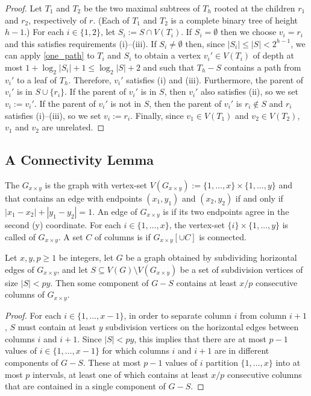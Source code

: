 \documentclass{patmorin}
\renewcommand{\le}{\leqslant}
\renewcommand{\ge}{\geqslant}
\begin{document}
\begin{proof}
  Let $T_1$ and $T_2$ be the two maximal subtrees of $T_h$ rooted at the children $r_1$ and $r_2$, respectively of $r$. (Each of $T_1$ and $T_2$ is a complete binary tree of height $h-1$.)  For each $i\in\{1,2\}$, let $S_i:=S\cap V(T_i)$.  If $S_i=\emptyset$ then we choose $v_i=r_i$ and this satisfies requirements (i)--(iii).  If $S_i\neq\emptyset$ then, since $|S_i|\le |S|< 2^{h-1}$, we can apply \cref{one_path} to $T_i$ and $S_i$ to obtain a vertex $v_i'\in V(T_i)$ of depth at most $1+\log_2|S_i|+1 \le \log_2 |S| + 2$ and such that $T_h-S$ contains a path from $v_i'$ to a leaf of $T_h$.  Therefore, $v_i'$ satisfies (i) and (iii).  Furthermore, the parent of $v_i'$ is in $S\cup\{r_i\}$.  If the parent of $v_i'$ is in $S$, then $v_i'$ also satisfies (ii), so we set $v_i:=v_i'$.  If the parent of $v_i'$ is not in $S$, then the parent of $v_i'$ is $r_i\not\in S$ and $r_i$ satisfies (i)--(iii), so we set $v_i:=r_i$.  Finally, since $v_1\in V(T_1)$ and $v_2\in V(T_2)$, $v_1$ and $v_2$ are unrelated.
\end{proof}

\subsection{A Connectivity Lemma}

The  $G_{x\times y}$ is the graph with vertex-set $V(G_{x\times y}):=\{1,\ldots,x\}\times\{1,\ldots,y\}$ and that contains an edge with endpoints $(x_1,y_1)$ and $(x_2,y_2)$ if and only if $|x_1-x_2|+|y_1-y_2|=1$.  An edge of $G_{x\times y}$ is  if its two endpoints agree in the second (y) coordinate.  For each $i\in\{1,\ldots,x\}$, the vertex-set $\{i\}\times\{1,\ldots,y\}$ is called  of $G_{x\times y}$.  A set $C$ of columns is  if $G_{x\times y}[\cup C]$ is connected.


\begin{lem}\label{grid_connectivity}
  Let $x,y,p\ge 1$ be integers, let $G$ be a graph obtained by subdividing horizontal edges of $G_{x\times y}$, and let $S\subseteq V(G)\setminus V(G_{x\times y})$ be a set of subdivision vertices of size $|S|< py$.  Then some component of $G-S$ contains at least $x/p$ consecutive columns of $G_{x\times y}$.
\end{lem}

\begin{proof}
  For each $i\in\{1,\ldots,x-1\}$, in order to separate column $i$ from column $i+1$, $S$ must contain at least $y$ subdivision vertices on the horizontal edges between columns $i$ and $i+1$.  Since $|S|< py$, this implies that there are at most $p-1$ values of $i\in\{1,\ldots,x-1\}$ for which columns $i$ and $i+1$ are in different components of $G-S$. These at most $p-1$ values of $i$ partition $\{1,\ldots,x\}$ into at most $p$ intervals, at least one of which contains at least $x/p$ consecutive columns that are contained in a single component of $G-S$.
\end{proof}
\end{document}
